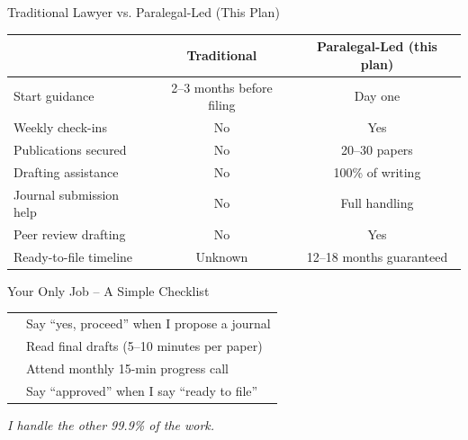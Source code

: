 \documentclass[aspectratio=169, 10pt]{beamer}
\begin{document}
	\begin{frame}{Traditional Lawyer vs. Paralegal-Led (This Plan)}
		\begin{table}
			\centering
			\scriptsize
			\begin{tabular}{lcc}
				\toprule
				& \textbf{Traditional} & \textbf{Paralegal-Led (this plan)} \\
				\midrule
				Start guidance & 2–3 months before filing & Day one \\
				Weekly check-ins & No & Yes \\
				Publications secured & No & 20–30 papers \\
				Drafting assistance & No & 100\% of writing \\
				Journal submission help & No & Full handling \\
				Peer review drafting & No & Yes \\
				Ready-to-file timeline & Unknown & 12–18 months guaranteed \\
				\bottomrule
			\end{tabular}
		\end{table}
	\end{frame}
	
	\begin{frame}{Your Only Job – A Simple Checklist}
		\centering
		\large
		\begin{tabular}{p{0.8cm}p{8cm}}
			\faCheckSquare & Say “yes, proceed” when I propose a journal \\
			\faCheckSquare & Read final drafts (5–10 minutes per paper) \\
			\faCheckSquare & Attend monthly 15-min progress call \\
			\faCheckSquare & Say “approved” when I say “ready to file” \\
		\end{tabular}
		
		\vspace{0.5cm}
		
		\vspace{0.3cm}
		\textit{I handle the other 99.9\% of the work.}
	\end{frame}
	
\end{document}
